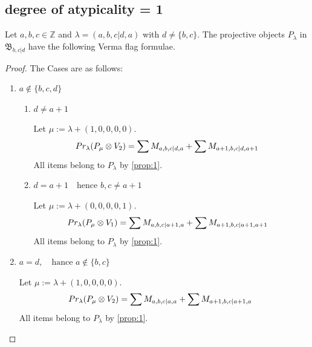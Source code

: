 
\subsection{degree of atypicality = 1}
\begin{theorem}
  Let $a,b,c \in \mathbb{Z}$ and $\lambda = (a,b,c|d,a)$ with $d \neq \{b,c\}$. The projective objects $P_{\lambda}$ in $\mathfrak{B}_{b,c|d}$ have the following Verma flag formulae.
\end{theorem}
\begin{proof} The Cases are as follows:\par
  \begin{enumerate}
    \item $a\notin \{b,c,d\}$ \par
      \begin{enumerate}
        \item $d \neq a+1$ \par
        Let $\mu:=\lambda + (1,0,0,0,0) $.
        \begin{equation}\notag
          \begin{aligned}
            Pr_{\lambda}(P_\mu \otimes V_{2}) &=
\sum M_{a,b,c|d,a}
+ \sum M_{a+1,b,c|d,a+1}
          \end{aligned}
        \end{equation}
All items belong to $P_\lambda$ by \cref{prop:1}.

    \item $d = a+1 \quad \text{hence } b,c \neq a+1 $ \par
        Let $\mu:=\lambda + (0,0,0,0,1) $.
        \begin{equation}\notag
          \begin{aligned}
            Pr_{\lambda}(P_\mu \otimes V_{1}) &=
\sum M_{a,b,c|a+1,a}
+ \sum M_{a+1,b,c|a+1,a+1}
          \end{aligned}
        \end{equation}
All items belong to $P_\lambda$ by \cref{prop:1}.
      \end{enumerate}

    \item $a=d, \quad \text{hance } a\notin \{b,c\}$ \par
        Let $\mu:=\lambda + (1,0,0,0,0) $.
        \begin{equation}\notag
          \begin{aligned}
            Pr_{\lambda}(P_\mu \otimes V_{2}) &=
\sum M_{a,b,c|a,a}
+ \sum M_{a+1,b,c|a+1,a}
          \end{aligned}
        \end{equation}
All items belong to $P_\lambda$ by \cref{prop:1}.


\end{enumerate}
\end{proof}

